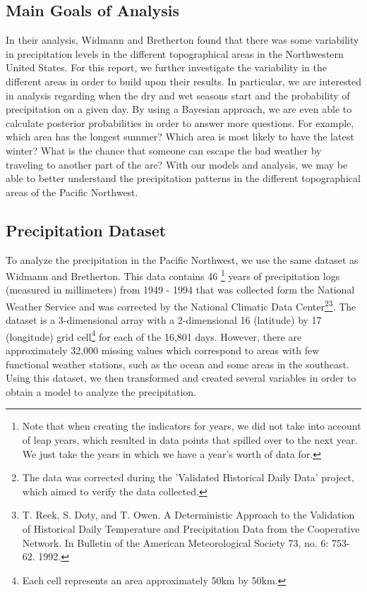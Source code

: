 \documentclass{article}
\begin{document}
\subsection{Main Goals of Analysis}
In their analysis, Widmann and Bretherton found that there was some variability in precipitation levels in the different topographical areas in the Northwestern United States. For this report, we further investigate the variability in the different areas in order to build upon their results. In particular, we are interested in analysis regarding when the dry and wet seasons start and the probability of precipitation on a given day. By using a Bayesian approach, we are even able to calculate posterior probabilities in order to answer more questions. For example, which area has the longest summer? Which area is most likely to have the latest winter?  What is the chance that someone can escape the bad weather by traveling to another part of the are? With our models and analysis, we may be able to better understand the precipitation patterns in the different topographical areas of the Pacific Northwest. 

\subsection{Precipitation Dataset}
To analyze the precipitation in the Pacific Northwest, we use the same dataset as Widmann and Bretherton. This data contains 46 \footnote{Note that when creating the indicators for years, we did not take into account of leap years, which resulted in data points that spilled over to the next year. We just take the years in which we have a year's worth of data for.} years of precipitation logs (measured in millimeters) from 1949 - 1994 that was collected form the National Weather Service and was corrected by the National Climatic Data Center\footnote{The data was corrected during the 'Validated Historical Daily Data' project, which aimed to verify the data collected.}\footnote{T. Reek, S. Doty, and T. Owen. A Deterministic Approach to the Validation of Historical Daily Temperature and Precipitation Data from the Cooperative Network. In Bulletin of the American Meteorological Society 73, no. 6: 753-62. 1992.}. The dataset is a 3-dimensional array with a 2-dimensional 16 (latitude) by 17 (longitude) grid cell\footnote{Each cell represents an area approximately 50km by 50km.} for each of the 16,801 days. However, there are approximately 32,000 missing values which correspond to areas with few functional weather stations, such as the ocean and some areas in the southeast. Using this dataset, we then transformed and created several variables in order to obtain a model to analyze the precipitation. 
\end{document}
